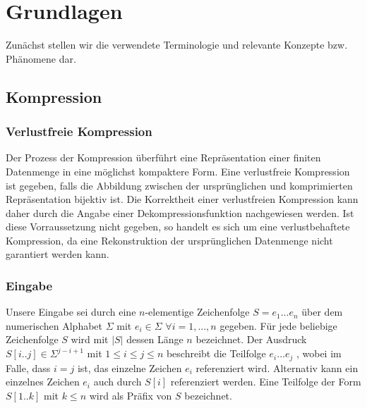 \chapter{Grundlagen}

Zunächst stellen wir die verwendete Terminologie und relevante Konzepte bzw. Phänomene dar.

\section{Kompression} \label{comp}

\subsection{Verlustfreie Kompression}
Der Prozess der Kompression überführt eine Repräsentation einer finiten Datenmenge in eine möglichst kompaktere Form. Eine verlustfreie Kompression ist gegeben, falls die Abbildung
zwischen der ursprünglichen und komprimierten Repräsentation bijektiv ist. Die Korrektheit einer verlustfreien Kompression kann daher durch die Angabe einer Dekompressionsfunktion 
nachgewiesen werden. Ist diese Vorraussetzung nicht gegeben, so handelt es sich um eine verlustbehaftete Kompression, da eine Rekonstruktion der ursprünglichen Datenmenge nicht 
garantiert werden kann.

\subsection{Eingabe}
Unsere Eingabe sei durch eine $n$-elementige Zeichenfolge $S=e_1...e_n$ über dem numerischen Alphabet $\Sigma$ mit $e_i\in \Sigma$ $\forall i=1,...,n$ gegeben. Für jede
beliebige Zeichenfolge $S$ wird mit $|S|$ dessen Länge $n$ bezeichnet. Der Ausdruck $S[i..j]\in \Sigma^{j-i+1}$ mit $1\leq i\leq j\leq n$ beschreibt die Teilfolge $e_i...e_j$ ,
wobei im Falle, dass $i=j$ ist, das einzelne Zeichen $e_i$ referenziert wird. Alternativ kann ein einzelnes Zeichen $e_i$ auch durch $S[i]$ referenziert werden. Eine Teilfolge 
der Form $S[1..k]$ mit $k\leq n$ wird als Präfix von $S$ bezeichnet.


